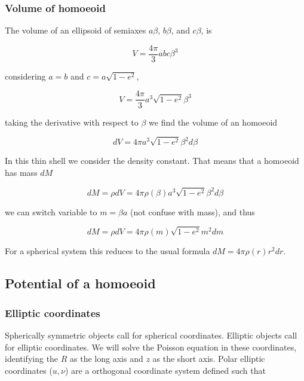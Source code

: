 \subsubsection{Volume of homoeoid}

The volume of an ellipsoid of semiaxes $a\beta$, $b\beta$, and $c\beta$, is  

\begin{equation}
V = \frac{4\pi}{3}abc \beta^3 
\end{equation}

considering $a=b$ and $c=a\sqrt{1-e^2}$,

\begin{equation}
V = \frac{4\pi}{3}a^3 \sqrt{1-e^2} \beta^3 
\end{equation}

taking the derivative with respect to $\beta$ we find the volume of an homoeoid

\begin{equation}
dV = 4\pi a^3 \sqrt{1-e^2} \beta^2 d\beta 
\end{equation}

In this thin shell we consider the density constant. That means that a homoeoid has mass $dM$

\begin{equation}
dM = \rho dV = 4\pi \rho(\beta) a^3 \sqrt{1-e^2} \beta^2 d\beta 
\end{equation}

we can switch variable to $m = \beta a $ (not confuse with mass), and thus 

\begin{equation}
dM = \rho dV = 4\pi \rho(m) \sqrt{1-e^2} m^2 dm 
\end{equation}

For a spherical system this reduces to the usual formula $dM = 4\pi \rho(r)  r^2 dr$.


\subsection{Potential of a homoeoid}


\subsubsection{Elliptic coordinates}

Spherically symmetric objects call for spherical coordinates. Elliptic objects call for elliptic coordinates. We will solve the Poisson equation in these coordinates, identifying the $R$ as the long axis and $z$ as the short axis. Polar elliptic coordinates ($u,\nu$) are a orthogonal coordinate system defined such that 

